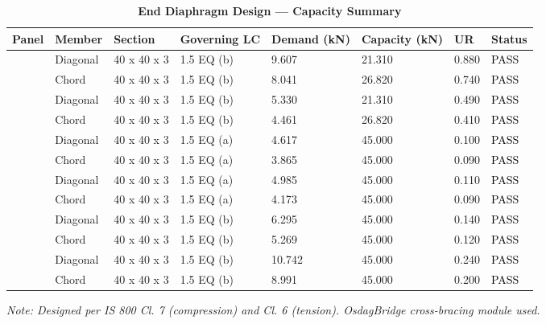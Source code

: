 \documentclass[12pt,a4paper]{report}
\numberwithin{table}{chapter}
\numberwithin{figure}{chapter}
\begin{document}
\vspace{1em}

\begin{longtable}{|C{2.0cm}|L{1.8cm}|C{2.2cm}|C{3.0cm}|C{1.8cm}|C{1.8cm}|C{1.2cm}|C{1.8cm}|}
\caption{\textbf{End Diaphragm Design --- Capacity Summary}}
\hline
\textbf{Panel} & \textbf{Member} & \textbf{Section} & \textbf{Governing LC} & \textbf{Demand (kN)} & \textbf{Capacity (kN)} & \textbf{UR} & \textbf{Status} \\[6pt]
\hline
{} & Diagonal & 40 x 40 x 3 & 1.5 EQ (b) & 9.607 & 21.310 & 0.880 & \textcolor{black}{PASS} \\[6pt]
 & Chord & 40 x 40 x 3 & 1.5 EQ (b) & 8.041 & 26.820 & 0.740 & \textcolor{black}{PASS} \\[6pt]
\hline
{} & Diagonal & 40 x 40 x 3 & 1.5 EQ (b) & 5.330 & 21.310 & 0.490 & \textcolor{black}{PASS} \\[6pt]
 & Chord & 40 x 40 x 3 & 1.5 EQ (b) & 4.461 & 26.820 & 0.410 & \textcolor{black}{PASS} \\[6pt]
\hline
{} & Diagonal & 40 x 40 x 3 & 1.5 EQ (a) & 4.617 & 45.000 & 0.100 & \textcolor{black}{PASS} \\[6pt]
 & Chord & 40 x 40 x 3 & 1.5 EQ (a) & 3.865 & 45.000 & 0.090 & \textcolor{black}{PASS} \\[6pt]
\hline
{} & Diagonal & 40 x 40 x 3 & 1.5 EQ (a) & 4.985 & 45.000 & 0.110 & \textcolor{black}{PASS} \\[6pt]
 & Chord & 40 x 40 x 3 & 1.5 EQ (a) & 4.173 & 45.000 & 0.090 & \textcolor{black}{PASS} \\[6pt]
\hline
{} & Diagonal & 40 x 40 x 3 & 1.5 EQ (b) & 6.295 & 45.000 & 0.140 & \textcolor{black}{PASS} \\[6pt]
 & Chord & 40 x 40 x 3 & 1.5 EQ (b) & 5.269 & 45.000 & 0.120 & \textcolor{black}{PASS} \\[6pt]
\hline
{} & Diagonal & 40 x 40 x 3 & 1.5 EQ (b) & 10.742 & 45.000 & 0.240 & \textcolor{black}{PASS} \\[6pt]
 & Chord & 40 x 40 x 3 & 1.5 EQ (b) & 8.991 & 45.000 & 0.200 & \textcolor{black}{PASS} \\[6pt]
\hline
\end{longtable}
\noindent\textit{Note: Designed per IS 800 Cl. 7 (compression) and Cl. 6 (tension). OsdagBridge cross-bracing module used.}
\end{document}
